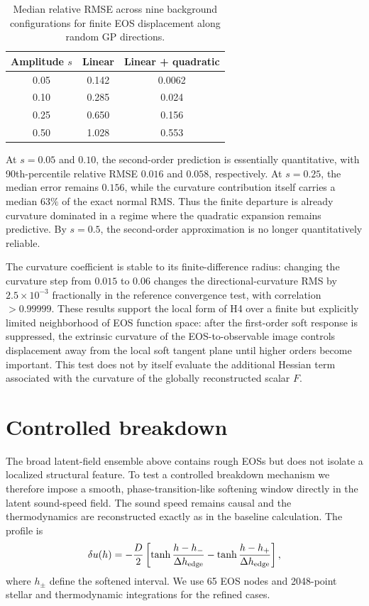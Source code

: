 \begin{table}[t]
\caption{Median relative RMSE across nine background configurations for
finite EOS displacement along random GP directions.}
\label{tab:curvature}
\begin{ruledtabular}
\begin{tabular}{ccc}
Amplitude \(s\) & Linear & Linear + quadratic\\
\hline
0.05 & 0.142 & 0.0062\\
0.10 & 0.285 & 0.024\\
0.25 & 0.650 & 0.156\\
0.50 & 1.028 & 0.553
\end{tabular}
\end{ruledtabular}
\end{table}

At \(s=0.05\) and \(0.10\), the second-order prediction is essentially
quantitative, with 90th-percentile relative RMSE \(0.016\) and \(0.058\),
respectively.  At \(s=0.25\), the median error remains \(0.156\), while the
curvature contribution itself carries a median \(63\%\) of the exact normal
RMS.  Thus the finite departure is already curvature dominated in a regime
where the quadratic expansion remains predictive.  By \(s=0.5\), the
second-order approximation is no longer quantitatively reliable.

The curvature coefficient is stable to its finite-difference radius:
changing the curvature step from \(0.015\) to \(0.06\) changes the
directional-curvature RMS by \(2.5\times10^{-3}\) fractionally in the
reference convergence test, with correlation \(>0.99999\).  These results support the local form of H4 over a finite but explicitly
limited neighborhood of EOS function space: after the first-order soft
response is suppressed, the extrinsic curvature of the EOS-to-observable
image controls displacement away from the local soft tangent plane until
higher orders become important.  This test does not by itself evaluate the
additional Hessian term associated with the curvature of the globally
reconstructed scalar \(F\).



\section{Controlled breakdown}
\label{sec:breakdown}

The broad latent-field ensemble above contains rough EOSs but does not isolate
a localized structural feature.  To test a controlled breakdown mechanism we
therefore impose a smooth, phase-transition-like softening window directly in
the latent sound-speed field.  The sound speed remains causal and the
thermodynamics are reconstructed exactly as in the baseline calculation.
The profile is
\begin{equation}
 \delta u(h)
 =
 -\frac{D}{2}
 \left[
  \tanh\frac{h-h_-}{\Delta h_{\rm edge}}
  -
  \tanh\frac{h-h_+}{\Delta h_{\rm edge}}
 \right],
 \label{eq:transition-window}
\end{equation}
where \(h_\pm\) define the softened interval.  We use 65 EOS nodes and
2048-point stellar and thermodynamic integrations for the refined cases.

